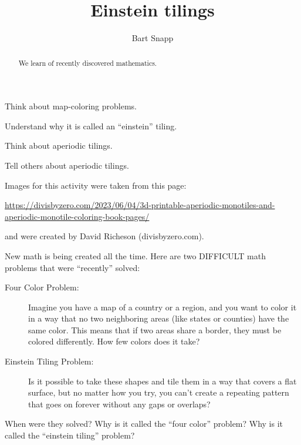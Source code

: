 \documentclass[noauthor,nooutcomes,handout,hints,12pt]{ximera}
\title{Einstein tilings}
\author{Bart Snapp}
\begin{document}
\begin{abstract}
We learn of recently discovered mathematics.
\end{abstract}
\maketitle

\begin{listOutcomes}
\item Think about map-coloring problems.
\item Understand why it is called an ``einstein'' tiling.
\item Think about aperiodic tilings.
\item Tell others about aperiodic tilings.
\end{listOutcomes}
Images for this activity were taken from this page:
\begin{center}
  \url{https://divisbyzero.com/2023/06/04/3d-printable-aperiodic-monotiles-and-aperiodic-monotile-coloring-book-pages/}
\end{center}
and were created by David Richeson (divisbyzero.com).


\mynewpage


\begin{question}
  New math is being created all the time. Here are two DIFFICULT math
  problems that were ``recently'' solved:
  \begin{description}
  \item[Four Color Problem:] Imagine you have a map of a country or a
    region, and you want to color it in a way that no two neighboring
    areas (like states or counties) have the same color. This means
    that if two areas share a border, they must be colored
    differently. How few colors does it take?
  \item[Einstein Tiling Problem:] Is it possible to take these shapes
    and tile them in a way that covers a flat surface, but no matter
    how you try, you can't create a repeating pattern that goes on
    forever without any gaps or overlaps?
  \end{description}
  When were they solved? Why is it called the ``four color'' problem? Why is it called the ``einstein tiling'' problem?
\end{question}

  
\mynewpage
\end{document}
